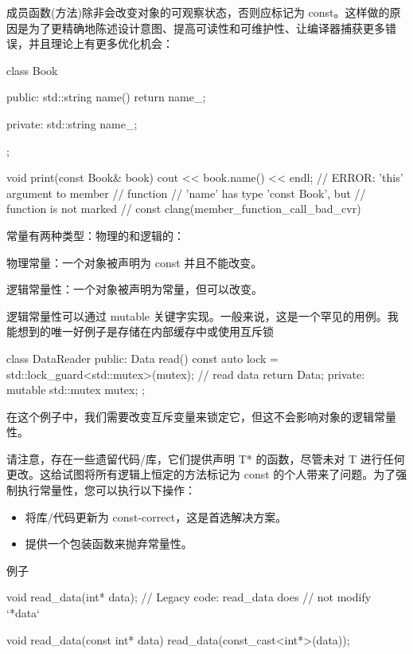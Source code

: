 
成员函数(方法)除非会改变对象的可观察状态，否则应标记为 const。这样做的原因是为了更精确地陈述设计意图、提高可读性和可维护性、让编译器捕获更多错误，并且理论上有更多优化机会：

\begin{cpp}
class Book {
public:
    std::string name() { return name_; }

private:
    std::string name_;
};

void print(const Book& book) {
    cout << book.name()
        << endl; // ERROR: 'this' argument to member
                 // function
                 // 'name' has type 'const Book', but
                 // function is not marked
                 // const clang(member_function_call_bad_cvr)
}
\end{cpp}

常量有两种类型：物理的和逻辑的：

物理常量：一个对象被声明为 const 并且不能改变。

逻辑常量性：一个对象被声明为常量，但可以改变。

逻辑常量性可以通过 mutable 关键字实现。一般来说，这是一个罕见的用例。我能想到的唯一好例子是存储在内部缓存中或使用互斥锁

\begin{cpp}
class DataReader {
public:
    Data read() const {
        auto lock = std::lock_guard<std::mutex>(mutex);
        // read data
        return Data{};
    }
private:
    mutable std::mutex mutex;
};
\end{cpp}

在这个例子中，我们需要改变互斥变量来锁定它，但这不会影响对象的逻辑常量性。

请注意，存在一些遗留代码/库，它们提供声明 T* 的函数，尽管未对 T 进行任何更改。这给试图将所有逻辑上恒定的方法标记为 const 的个人带来了问题。为了强制执行常量性，您可以执行以下操作：

\begin{itemize}
\item
将库/代码更新为 const-correct，这是首选解决方案。

\item
提供一个包装函数来抛弃常量性。
\end{itemize}

例子

\begin{cpp}
void read_data(int* data); // Legacy code: read_data does
                           // not modify `*data`

void read_data(const int* data) {
    read_data(const_cast<int*>(data));
}
\end{cpp}

